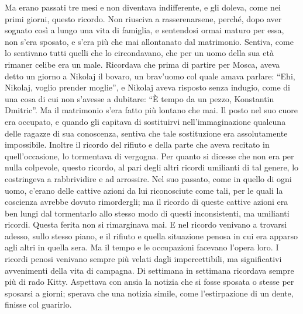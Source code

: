 Ma erano passati tre mesi e non diventava indifferente, e gli doleva, come nei primi giorni, questo ricordo. Non riusciva a rasserenarsene, perché, dopo aver sognato così a lungo una vita di famiglia, e sentendosi ormai maturo per essa, non s'era sposato, e s'era più che mai allontanato dal matrimonio. Sentiva, come lo sentivano tutti quelli che lo circondavano, che per un uomo della sua età rimaner celibe era un male. Ricordava che prima di partire per Mosca, aveva detto un giorno a Nikolaj il bovaro, un brav'uomo col quale amava parlare: ``Ehi, Nikolaj, voglio prender moglie'', e Nikolaj aveva risposto senza indugio, come di una cosa di cui non s'avesse a dubitare: ``È tempo da un pezzo, Konstantin Dmitric''. Ma il matrimonio s'era fatto più lontano che mai. Il posto nel suo cuore era occupato, e quando gli capitava di sostituirvi nell'immaginazione qualcuna delle ragazze di sua conoscenza, sentiva che tale sostituzione era assolutamente impossibile. Inoltre il ricordo del rifiuto e della parte che aveva recitato in quell'occasione, lo tormentava di vergogna. Per quanto si dicesse che non era per nulla colpevole, questo ricordo, al pari degli altri ricordi umilianti di tal genere, lo costringeva a rabbrividire e ad arrossire. Nel suo passato, come in quello di ogni uomo, c'erano delle cattive azioni da lui riconosciute come tali, per le quali la coscienza avrebbe dovuto rimordergli; ma il ricordo di queste cattive azioni era ben lungi dal tormentarlo allo stesso modo di questi inconsistenti, ma umilianti ricordi. Questa ferita non si rimarginava mai. E nel ricordo venivano a trovarsi adesso, sullo stesso piano, e il rifiuto e quella situazione penosa in cui era apparso agli altri in quella sera. Ma il tempo e le occupazioni facevano l'opera loro. I ricordi penosi venivano sempre più velati dagli impercettibili, ma significativi avvenimenti della vita di campagna. Di settimana in settimana ricordava sempre più di rado Kitty. Aspettava con ansia la notizia che si fosse sposata o stesse per sposarsi a giorni; sperava che una notizia simile, come l'estirpazione di un dente, finisse col guarirlo. 

